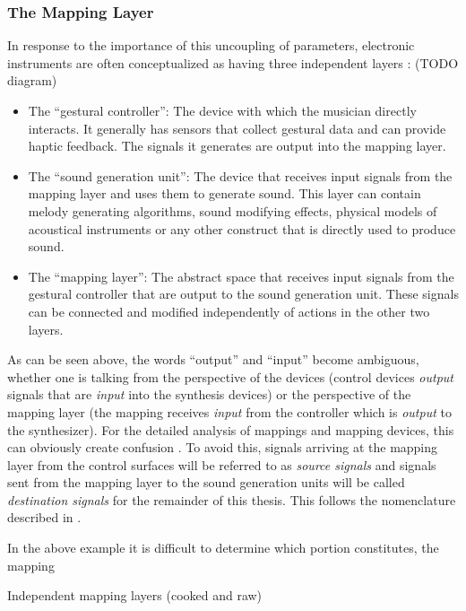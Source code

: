 	\subsubsection{The Mapping Layer}

In response to the importance of this uncoupling of parameters, electronic instruments are often conceptualized as having three independent layers \cite{gestural_control_sound_synthesis}: (TODO diagram)

	\begin{itemize}
		\item The ``gestural controller'': The device with which the musician directly interacts. It generally has sensors that collect gestural data and can provide haptic feedback. The signals it generates are output into the mapping layer.
		\item The ``sound generation unit'': The device that receives input signals from the mapping layer and uses them to generate sound. This layer can contain melody generating algorithms, sound modifying effects, physical models of acoustical instruments or any other construct that is directly used to produce sound.
		\item The ``mapping layer'': The abstract space that receives input signals from the gestural controller that are output to the sound generation unit. These signals can be connected and modified independently of actions in the other two layers.
	\end{itemize}

As can be seen above, the words ``output'' and ``input'' become ambiguous, whether one is talking from the perspective of the devices (control devices \emph{output} signals that are \emph{input} into the synthesis devices) or the perspective of the mapping layer (the mapping receives \emph{input} from the controller which is \emph{output} to the synthesizer). For the detailed analysis of mappings and mapping devices, this can obviously create confusion \cite{vizmapper}. To avoid this, signals arriving at the mapping layer from the control surfaces will be referred to as \emph{source signals} and signals sent from the mapping layer to the sound generation units will be called \emph{destination signals} for the remainder of this thesis. This follows the nomenclature described in .

In the above example it is difficult to determine which portion constitutes, the mapping

Independent mapping layers (cooked and raw) \cite{wanderley}

